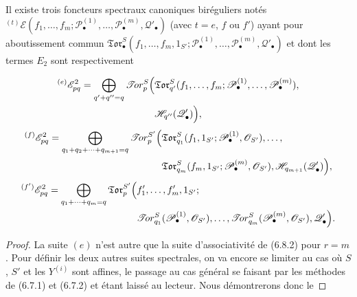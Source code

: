 \begin{proposition}[6.9.3]
Il existe trois foncteurs spectraux canoniques biréguliers notés
${}^{(t)}\mathscr E(f_1,\ldots,f_m;
\mathscr P_\bullet^{(1)},\ldots,\mathscr P_\bullet^{(m)},
\mathscr Q'_\bullet)$ (avec $t=e$, $f$ ou $f'$) ayant pour aboutissement
commun
$\mathfrak{Tor}_\bullet^S(f_1,\ldots,f_m,1_{S'};
\mathscr P_\bullet^{(1)},\ldots,\mathscr P_\bullet^{(m)},
\mathscr Q'_\bullet)$ et dont les termes $E_2$ sont respectivement

\[
\begin{split}
  {}^{(e)}\mathscr E_{pq}^2
  =\bigoplus_{q'+q''=q}
  \mathscr{T}\!or_p^S\Bigl(
  &\mathfrak{Tor}_{q'}^S
  (f_1,\ldots,f_m;
   \mathscr P_\bullet^{(1)},\ldots,\mathscr P_\bullet^{(m)}),\\
  &\mathscr H_{q''}(\mathscr Q'_\bullet)
  \Bigr),
\end{split}
\]
\[
\begin{split}
  {}^{(f)}\mathscr E_{pq}^2
  =\bigoplus_{q_1+q_2+\cdots+q_{m+1}=q}
  \mathscr{T}\!or_p^{S'}\Bigl(
  &\mathfrak{Tor}_{q_1}^S
  (f_1,1_{S'};\mathscr P_\bullet^{(1)},\mathscr O_{S'}),\ldots,\\
  &\mathfrak{Tor}_{q_m}^S
  (f_m,1_{S'};\mathscr P_\bullet^{(m)},\mathscr O_{S'}),
  \mathscr H_{q_{m+1}}(\mathscr Q'_\bullet)
  \Bigr),
\end{split}
\]
\[
\begin{split}
  {}^{(f')}\mathscr E_{pq}^2
  =\bigoplus_{q_1+\cdots+q_m=q}
  \mathfrak{Tor}_p^{S'}\Bigl(
  &f'_1,\ldots,f'_m,1_{S'};\\
  &\mathscr{T}\!or_{q_1}^S
  (\mathscr P_\bullet^{(1)},\mathscr O_{S'}),\ldots,
  \mathscr{T}\!or_{q_m}^S
  (\mathscr P_\bullet^{(m)},\mathscr O_{S'}),
  \mathscr Q'_\bullet
  \Bigr).
\end{split}
\]
\end{proposition}

\begin{proof}
La suite $(e)$ n'est autre que la suite d'associativité de (6.8.2) pour
$r=m$. Pour définir les deux autres suites spectrales, on va encore se limiter
au cas où $S$, $S'$ et les $Y^{(i)}$ sont affines, le passage au cas général
se faisant par les méthodes de (6.7.1) et (6.7.2) et étant laissé au lecteur.
Nous démontrerons donc le
\end{proof}


